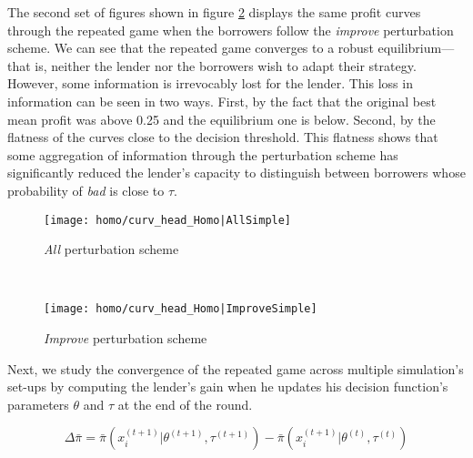 \documentclass[12pt]{article} %
\begin{document}
The second set of figures shown in figure \ref{fig:curv_ImproveSimple} displays the same profit curves through the repeated game when the borrowers follow the \textit{improve} perturbation scheme. We can see that the repeated game converges to a robust equilibrium---that is, neither the lender nor the borrowers wish to adapt their strategy. However, some information is irrevocably lost for the lender. This loss in information can be seen in two ways. First, by the fact that the original best mean profit was above 0.25 and the equilibrium one is below. Second, by the flatness of the curves close to the decision threshold. This flatness shows that some aggregation of information through the perturbation scheme has significantly reduced the lender's capacity to distinguish between borrowers whose probability of \textit{bad} is close to $\tau$. 



\begin{figure*}[ht!]
    \centering
    \begin{subfigure}{0.5\textwidth}
        \centering
        \texttt{[image: homo/curv\_head\_Homo|AllSimple]}
        \caption{\textit{All} perturbation scheme}
        \label{fig:curv_allSimple}
    \end{subfigure}%
    ~ 
    \begin{subfigure}{0.5\textwidth}
        \centering
        \texttt{[image: homo/curv\_head\_Homo|ImproveSimple]}
            \caption{\textit{Improve} perturbation scheme}
        \label{fig:curv_ImproveSimple}
    \end{subfigure}
    \caption{In the aboves' figures, we show one figure for each of the first five rounds of the repeated game.  
    The figure at round $t$ shows the profit curves for the lender with the borrowers' data perturbed $t$ time and $t+1$ times, i.e $\bar{\pi}(x_i^{(t)})$ and $\bar{\pi}(x_i^{(t+1)})$. The x-axis shows the decision threshold in percentage points. The y-axis displays the average profit per borrower demanding a loan as defined in equation \eqref{equ:pi_bar}.
    }
\end{figure*}


\clearpage

Next, we study the convergence of the repeated game across multiple simulation's set-ups by computing the lender's gain when he updates his decision function's parameters $\theta$ and $\tau$ at the end of the round.

\begin{equation}\label{equ:delta_bar_pi_def}
\Delta \bar{\pi} = \bar{\pi}(x_i^{(t+1)}|\theta^{(t+1)}, \tau^{(t+1)})-\bar{\pi}(x_i^{(t+1)}|\theta^{(t)}, \tau^{(t)})
\end{equation}
\end{document}
